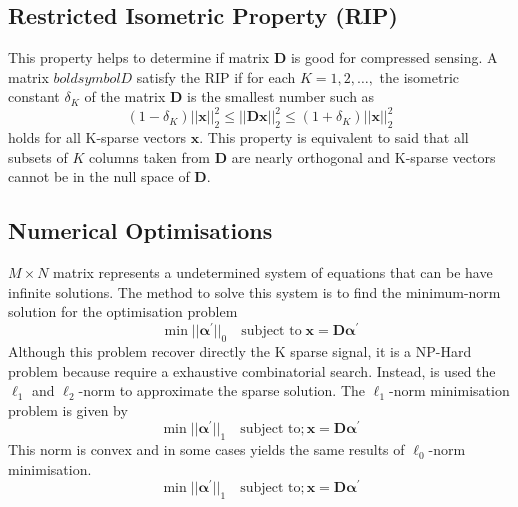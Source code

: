 \subsection{Restricted Isometric Property (RIP)}

This property helps to determine if matrix $\boldsymbol{D}$ is good for compressed sensing. A matrix $boldsymbol{D}$ satisfy the RIP if for each $K = 1,2, \ldots,$ the isometric constant $\delta_K$ of the matrix $\boldsymbol{D}$ is the smallest number such as
\begin{equation}
(1-\delta_K)||\boldsymbol{x}||_2^2 \leq ||\boldsymbol{Dx}||^2_2 \leq (1+\delta_K)||\boldsymbol{x}||^2_2
\end{equation}
holds for all K-sparse vectors $\boldsymbol{x}$. This property is equivalent to said that all subsets of $K$ columns taken from $\boldsymbol{D}$ are nearly orthogonal and K-sparse vectors cannot be in the null space
of $\boldsymbol{D}$.

\subsection{Numerical Optimisations}

$M \times N$ matrix represents a undetermined system of equations that can be have infinite solutions. The method to solve this system is to find the minimum-norm solution for the optimisation problem 
\begin{equation}
\min||\boldsymbol{\alpha^\prime}||_0 \quad \textrm{subject to} \; \boldsymbol{x} = \boldsymbol{D \alpha^\prime}
\end{equation}
Although this problem recover directly the K sparse signal, it is a NP-Hard problem because require a exhaustive combinatorial search. Instead, is used the $\ell_1$ and $\ell_2$-norm to approximate the sparse solution. The $\ell_1$-norm minimisation problem is given by
\begin{equation}
\min||\boldsymbol{\alpha^\prime}||_1 \quad \textrm{subject to}; \boldsymbol{x} = \boldsymbol{D \alpha^\prime}
\end{equation}
This norm is convex and in some cases yields the same results of $\ell_0$-norm minimisation.
\begin{equation}
\min||\boldsymbol{\alpha^\prime}||_1 \quad \textrm{subject to}; \boldsymbol{x} = \boldsymbol{D \alpha^\prime}
\end{equation}

